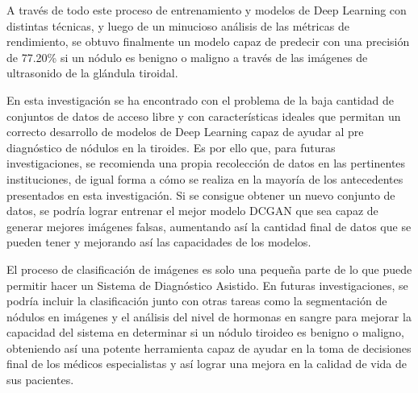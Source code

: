 A través de todo este proceso de entrenamiento y modelos de Deep Learning con distintas técnicas, y luego de un minucioso análisis de las métricas de rendimiento, se obtuvo finalmente un modelo capaz de predecir con una precisión de 77.20\% si un nódulo es benigno o maligno a través de las imágenes de ultrasonido de la glándula tiroidal.

En esta investigación se ha encontrado con el problema de la baja cantidad de conjuntos de datos de acceso libre y con características ideales que permitan un correcto desarrollo de modelos de Deep Learning capaz de ayudar al pre diagnóstico de nódulos en la tiroides. Es por ello que, para futuras investigaciones, se recomienda una propia recolección de datos en las pertinentes instituciones, de igual forma a cómo se realiza en la mayoría de los antecedentes presentados en esta investigación. Si se consigue obtener un nuevo conjunto de datos, se podría lograr entrenar el mejor modelo DCGAN que sea capaz de generar mejores imágenes falsas, aumentando así la cantidad final de datos que se pueden tener y mejorando así las capacidades de los modelos.

El proceso de clasificación de imágenes es solo una pequeña parte de lo que puede permitir hacer un Sistema de Diagnóstico Asistido. En futuras investigaciones, se podría incluir la clasificación junto con otras tareas como la segmentación de nódulos en imágenes y el análisis del nivel de hormonas en sangre para mejorar la capacidad del sistema en determinar si un nódulo tiroideo es benigno o maligno, obteniendo así una potente herramienta capaz de ayudar en la toma de decisiones final de los médicos especialistas y así lograr una mejora en la calidad de vida de sus pacientes.

